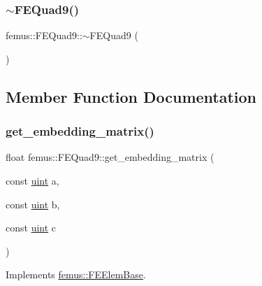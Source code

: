 \mbox{\label{classfemus_1_1_f_e_quad9_aab5566e0872fcf558714f0aa062d5805}} 
\subsubsection{\texorpdfstring{$\sim$\+F\+E\+Quad9()}{~FEQuad9()}}
{\footnotesize\ttfamily femus\+::\+F\+E\+Quad9\+::$\sim$\+F\+E\+Quad9 (\begin{DoxyParamCaption}{ }\end{DoxyParamCaption})}



\subsection{Member Function Documentation}
\mbox{\label{classfemus_1_1_f_e_quad9_a2c82794ee74ebbbde0fd8e9c9b73ba7a}} 
\subsubsection{\texorpdfstring{get\+\_\+embedding\+\_\+matrix()}{get\_embedding\_matrix()}}
{\footnotesize\ttfamily float femus\+::\+F\+E\+Quad9\+::get\+\_\+embedding\+\_\+matrix (\begin{DoxyParamCaption}\item[{const \mbox{\hyperlink{_typedefs_8hpp_a91ad9478d81a7aaf2593e8d9c3d06a14}{uint}}}]{a,  }\item[{const \mbox{\hyperlink{_typedefs_8hpp_a91ad9478d81a7aaf2593e8d9c3d06a14}{uint}}}]{b,  }\item[{const \mbox{\hyperlink{_typedefs_8hpp_a91ad9478d81a7aaf2593e8d9c3d06a14}{uint}}}]{c }\end{DoxyParamCaption})\hspace{0.3cm}{\ttfamily [virtual]}}



Implements \mbox{\hyperlink{classfemus_1_1_f_e_elem_base_a0c4d6d5ec66bd4e301eb8ea2ef10f354}{femus\+::\+F\+E\+Elem\+Base}}.

